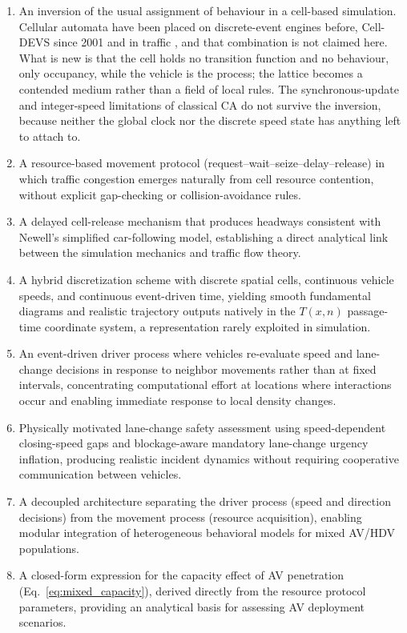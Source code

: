 \documentclass[review,number]{elsarticle}
\begin{document}
\begin{enumerate}
    \item An inversion of the usual assignment of behaviour in a cell-based simulation. Cellular automata have been placed on discrete-event engines before, Cell-DEVS \citep{wainer2001timed,wainer2014cellular} since 2001 and in traffic \citep{davidson2000specifying,wainer2006atlas}, and that combination is not claimed here. What is new is that the cell holds no transition function and no behaviour, only occupancy, while the vehicle is the process; the lattice becomes a contended medium rather than a field of local rules. The synchronous-update and integer-speed limitations of classical CA do not survive the inversion, because neither the global clock nor the discrete speed state has anything left to attach to.

    \item A resource-based movement protocol (request--wait--seize--delay--release) in which traffic congestion emerges naturally from cell resource contention, without explicit gap-checking or collision-avoidance rules.

    \item A delayed cell-release mechanism that produces headways consistent with Newell's simplified car-following model, establishing a direct analytical link between the simulation mechanics and traffic flow theory.

    \item A hybrid discretization scheme with discrete spatial cells, continuous vehicle speeds, and continuous event-driven time, yielding smooth fundamental diagrams and realistic trajectory outputs natively in the $T(x,n)$ passage-time coordinate system, a representation rarely exploited in simulation.

    \item An event-driven driver process where vehicles re-evaluate speed and lane-change decisions in response to neighbor movements rather than at fixed intervals, concentrating computational effort at locations where interactions occur and enabling immediate response to local density changes.

    \item Physically motivated lane-change safety assessment using speed-dependent closing-speed gaps and blockage-aware mandatory lane-change urgency inflation, producing realistic incident dynamics without requiring cooperative communication between vehicles.

    \item A decoupled architecture separating the driver process (speed and direction decisions) from the movement process (resource acquisition), enabling modular integration of heterogeneous behavioral models for mixed AV/HDV populations.

    \item A closed-form expression for the capacity effect of AV penetration (Eq.~\ref{eq:mixed_capacity}), derived directly from the resource protocol parameters, providing an analytical basis for assessing AV deployment scenarios.
\end{enumerate}
\end{document}
